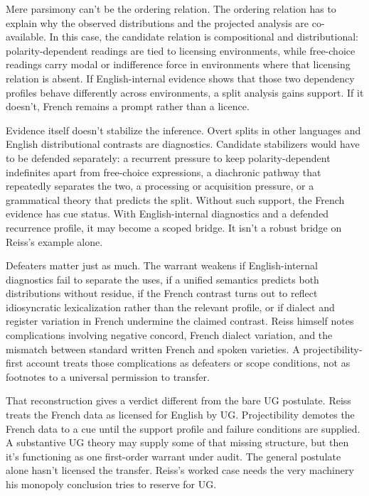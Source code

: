 \documentclass[12pt]{article}
\begin{document}
Mere parsimony can't be the ordering relation. The ordering relation has to explain why the observed distributions and the projected analysis are co-available. In this case, the candidate relation is compositional and distributional: polarity-dependent readings are tied to licensing environments, while free-choice readings carry modal or indifference force in environments where that licensing relation is absent. If English-internal evidence shows that those two dependency profiles behave differently across environments, a split analysis gains support. If it doesn't, French remains a prompt rather than a licence.

Evidence itself doesn't stabilize the inference. Overt splits in other languages and English distributional contrasts are diagnostics. Candidate stabilizers would have to be defended separately: a recurrent pressure to keep polarity-dependent indefinites apart from free-choice expressions, a diachronic pathway that repeatedly separates the two, a processing or acquisition pressure, or a grammatical theory that predicts the split. Without such support, the French evidence has cue status. With English-internal diagnostics and a defended recurrence profile, it may become a scoped bridge. It isn't a robust bridge on Reiss's example alone.

Defeaters matter just as much. The warrant weakens if English-internal diagnostics fail to separate the uses, if a unified semantics predicts both distributions without residue, if the French contrast turns out to reflect idiosyncratic lexicalization rather than the relevant profile, or if dialect and register variation in French undermine the claimed contrast. Reiss himself notes complications involving negative concord, French dialect variation, and the mismatch between standard written French and spoken varieties. A projectibility-first account treats those complications as defeaters or scope conditions, not as footnotes to a universal permission to transfer.

That reconstruction gives a verdict different from the bare UG postulate. Reiss treats the French data as licensed for English by UG. Projectibility demotes the French data to a cue until the support profile and failure conditions are supplied. A substantive UG theory may supply some of that missing structure, but then it's functioning as one first-order warrant under audit. The general postulate alone hasn't licensed the transfer. Reiss's worked case needs the very machinery his monopoly conclusion tries to reserve for UG.
\end{document}
